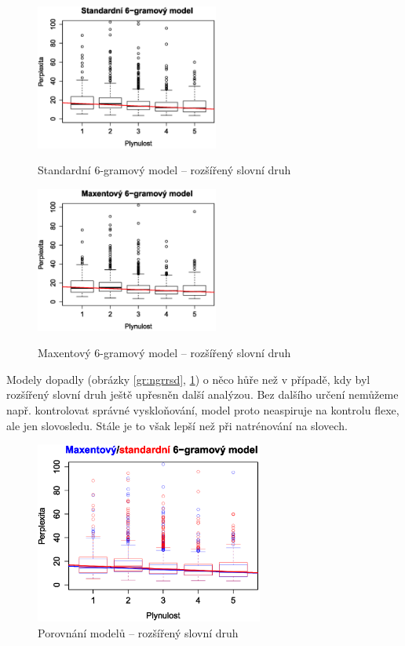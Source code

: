 \documentclass[12pt,a4paper]{report}
\begin{document}
\begin{figure}[!htb]
\begin{center}
  \centering\includegraphics[width=60mm]{./grafy/morf/ngram/rsd.svg.eps}
  \caption{Standardní 6-gramový model -- rozšířený slovní druh}\label{gr:ngrrsd}
\endminipage\quad
{}
  \centering\includegraphics[width=60mm]{./grafy/morf/maxent/rsd.svg.eps}
  \caption{Maxentový 6-gramový model -- rozšířený slovní druh}\label{gr:maxrsd}
\endminipage
\end{center}
\end{figure}


Modely dopadly (obrázky \ref{gr:ngrrsd}, \ref{gr:maxrsd}) o něco hůře než v případě, kdy byl rozšířený slovní druh ještě upřesněn další analýzou. Bez dalšího určení nemůžeme např. kontrolovat správné vyskloňování, model proto neaspiruje na kontrolu flexe, ale jen slovosledu. Stále je to však lepší než při natrénování na slovech.



\pagebreak


\begin{figure}[!htbp]
\begin{center}
	\centering
	\includegraphics[width=75mm]{./grafy/morf/porovnani/rsd.svg.eps}	
	\caption{Porovnání modelů -- rozšířený slovní druh}\label{gr:porrsd}
\endminipage
\end{center}
\end{figure}
\end{document}
